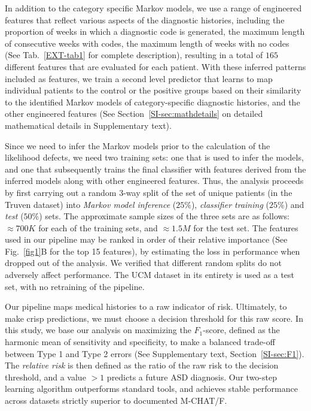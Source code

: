\documentclass[onecolumn,10pt]{IEEEtran}
\def\treatment{positive\xspace}
\begin{document}
In addition to the category specific Markov models, we use a range of engineered features that reflect various aspects of the diagnostic histories, including the proportion of weeks in which a diagnostic code is generated, the maximum length of consecutive weeks with codes, the maximum length of weeks with no codes (See Tab.~\ref{EXT-tab1} for complete description), resulting in a total of $165$ different features that are evaluated for each patient. With these inferred patterns included as features,  we train a second level predictor that learns to map   individual patients  to the control or the \treatment groups based on their  similarity  to the identified  Markov models of category-specific diagnostic histories, and the other engineered features (See Section~\ref{SI-sec:mathdetails} on detailed mathematical details  in Supplementary  text).


Since we need to infer the Markov models prior to the calculation of the likelihood defects, we need two training sets: one that is used to infer the models, and one that subsequently trains the final classifier  with features  derived  from the inferred models along with other engineered features. Thus, the analysis proceeds by first carrying out a random 3-way split of the set of unique patients (in the Truven dataset) into \textit{Markov model inference} ($25\%$), \textit{classifier training} ($25\%$) and \textit{test} ($50\%$) sets. The approximate sample sizes of the three sets are as follows: $\approx 700K$ for each of  the training sets, and $\approx 1.5M$ for the test set. The features used in our pipeline may be ranked in order of their relative importance (See Fig.~\ref{fig1}B for the top 15 features), by
estimating the loss in performance when dropped out of the analysis. We verified that different random splits do not adversely affect performance. The UCM dataset in its entirety is used as a test set, with no retraining of the pipeline.

Our pipeline maps medical histories to a   raw indicator of 
risk. Ultimately, to make crisp predictions, we must choose  a decision threshold for this raw score. In this study, we base our analysis on maximizing the $F_1$-score, defined as the harmonic mean of sensitivity and specificity, to make a   balanced trade-off between Type 1 and Type 2 errors (See Supplementary text, Section~\ref{SI-sec:F1}). The \textit{relative risk} is then defined as the ratio of the raw  risk to the  decision threshold, and a value  $>1$  predicts a future ASD diagnosis. Our two-step learning algorithm outperforms standard tools, and achieves  stable performance across datasets strictly superior to documented M-CHAT/F.
\end{document}
